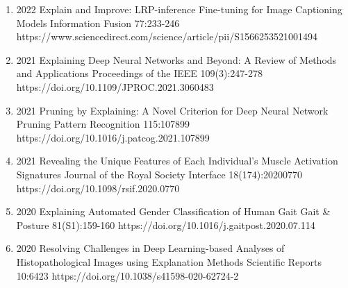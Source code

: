 \documentclass[10pt,a4paper]{article} %
\begin{document}
{\begin{enumerate}
    \item {}
                       {2022}
                       {Explain and Improve: LRP-inference Fine-tuning for Image Captioning Models}
                       {Information Fusion}
                       {77:233-246}
                       {https://www.sciencedirect.com/science/article/pii/S1566253521001494}

    \item {}
                        {2021}
                        {Explaining Deep Neural Networks and Beyond: A Review of Methods and Applications}
                        {Proceedings of the IEEE}
                        {109(3):247-278}
                        {https://doi.org/10.1109/JPROC.2021.3060483}

    \item {}
                        {2021}
                        {Pruning by Explaining: A Novel Criterion for Deep Neural Network Pruning}
                        {Pattern Recognition}
                        {115:107899}
                        {https://doi.org/10.1016/j.patcog.2021.107899}

    \item {}
                        {2021}
                        {Revealing the Unique Features of Each Individual's Muscle Activation Signatures}
                        {Journal of the Royal Society Interface}
                        {18(174):20200770}
                        {https://doi.org/10.1098/rsif.2020.0770}

    \item {}
                        {2020}
                        {Explaining Automated Gender Classification of Human Gait}
                        {Gait \& Posture}
                        {81(S1):159-160}
                        {https://doi.org/10.1016/j.gaitpost.2020.07.114}

    \item {}
                        {2020}
                        {Resolving Challenges in Deep Learning-based Analyses of Histopathological Images using Explanation Methods}
                        {Scientific Reports}
                        {10:6423}
                        {https://doi.org/10.1038/s41598-020-62724-2}


\end{enumerate}}
\end{document}

